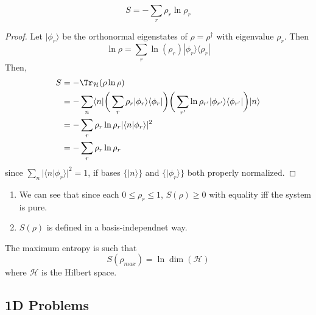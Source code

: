 \documentclass[a4paper]{article}
\begin{document}
\begin{prop}
$$S=-\sum_r\rho_r\ln\rho_r$$
\end{prop}
\begin{proof}
Let $|\phi_r\rangle$ be the orthonormal eigenstates of $\rho=\rho^\dag$ with eigenvalue $\rho_r$. Then
$$\ln\rho=\sum_r\ln(\rho_r)|\phi_r\rangle\langle\rho_r|$$
Then, 
\begin{align}
S&=-\Tr_{\mathcal{H}}(\rho\ln\rho)\nonumber\\&=-\sum_n\langle n|\bigg(\sum_r\rho_r|\phi_r\rangle\langle\phi_r|\bigg)\bigg(\sum_{r'}\ln\rho_{r'}|\phi_{r'}\rangle\langle\phi_{r'}|\bigg)|n\rangle\nonumber\\&=-\sum_r\rho_r\ln\rho_r|\langle n|\phi_r\rangle|^2\nonumber\\&=-\sum_r\rho_r\ln\rho_r\nonumber
\end{align}
since $\sum_n|\langle n|\phi_r\rangle|^2=1$, if bases $\{|n\rangle\}$ and $\{|\phi_r\rangle\}$ both properly normalized. 
\end{proof}
\begin{remarks}\leavevmode
\begin{enumerate}
\item We can see that since each $0\leq\rho_r\leq 1$, $S(\rho)\geq0$ with equality iff the system is pure. 
\item $S(\rho)$ is defined in a basis-independnet way.
\end{enumerate}
\end{remarks}
\begin{prop}
The maximum entropy is such that
$$S(\rho_{max})=\ln\dim(\mathcal{H})$$
where $\mathcal{H}$ is the Hilbert space.
\end{prop}
\newpage
\subsection{1D Problems}
\end{document}
